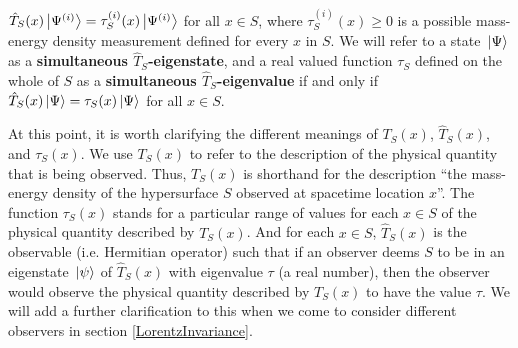   $\hat{T}_S(x)\ket{\Psi^{(i)}}=\tau^{(i)}_S(x)\ket{\Psi^{(i)}}$ for all $x\in S$, where $\tau^{(i)}_S(x)\geq 0$ is a possible mass-energy density measurement defined for every $x$ in $S$. We will refer to a state $\ket*{\Psi}$ as a \textbf{simultaneous $\hat{T}_S$-eigenstate}, and a real valued function $\tau_S$ defined on the whole of $S$ as a  \textbf{simultaneous $\hat{T}_S$-eigenvalue} if and only if $\hat{T}_S(x)\ket*{\Psi}=\tau_S(x)\ket*{\Psi}$ for all $x\in S$.\label{simultaneous}

 At this point, it is worth clarifying the different meanings of $T_S(x)$, $\hat{T}_S(x)$, and $\tau_S(x)$.\label{TSclarification} We use $T_S(x)$ to refer to the description of the physical quantity that is being observed. Thus, $T_S(x)$ is shorthand for the description ``the mass-energy density of the hypersurface $S$ observed at spacetime location $x$''. The function $\tau_S(x)$ stands for a particular range of values for each $x\in S$ of the physical quantity described by $T_S(x)$. And for each $x\in S$, $\hat{T}_S(x)$ is the observable (i.e. Hermitian operator) such that if an observer deems $S$ to be in an eigenstate $\ket*{\psi}$ of  $\hat{T}_S(x)$ with eigenvalue $\tau$ (a real number), then the observer would observe the physical quantity described by  $T_S(x)$ to have the value $\tau$. We will add a further clarification to this when we come to consider different observers in section \ref{LorentzInvariance}.

